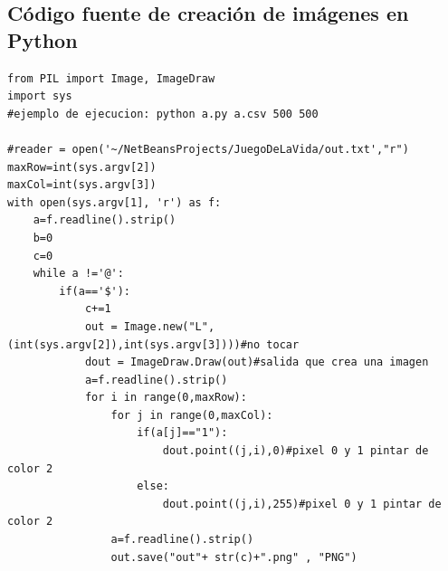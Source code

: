 \documentclass[12pt,letterpaper]{article}
\begin{document}
\subsection{Código fuente de creación de imágenes en Python}
\begin{lstlisting}
from PIL import Image, ImageDraw
import sys
#ejemplo de ejecucion: python a.py a.csv 500 500

#reader = open('~/NetBeansProjects/JuegoDeLaVida/out.txt',"r")
maxRow=int(sys.argv[2])
maxCol=int(sys.argv[3])
with open(sys.argv[1], 'r') as f:
	a=f.readline().strip()
	b=0
	c=0	
	while a !='@':
		if(a=='$'):
			c+=1
			out = Image.new("L",(int(sys.argv[2]),int(sys.argv[3])))#no tocar
			dout = ImageDraw.Draw(out)#salida que crea una imagen
			a=f.readline().strip()
			for i in range(0,maxRow):
				for j in range(0,maxCol):
					if(a[j]=="1"):
						dout.point((j,i),0)#pixel 0 y 1 pintar de color 2
					else:
						dout.point((j,i),255)#pixel 0 y 1 pintar de color 2
				a=f.readline().strip()
				out.save("out"+ str(c)+".png" , "PNG")

\end{lstlisting}
\end{document}
